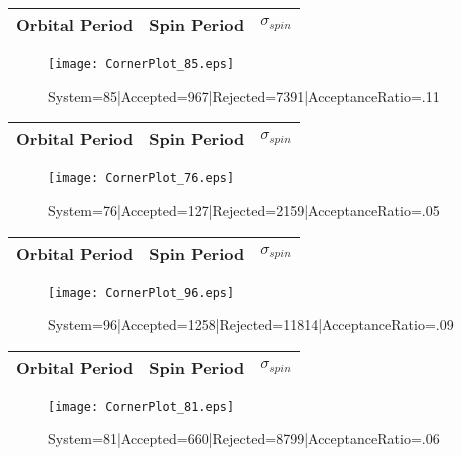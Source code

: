 \documentclass[10pt]{article}
\begin{document}
\listoffigures
\begin{center}
        \begin{tabular}{|c|c|c|}
        \hline
Orbital Period & Spin Period & $\sigma_{spin}$ \\
 \hline
        \end{tabular}
        \end{center}
\begin{figure}[h] 
        \texttt{[image: CornerPlot\_85.eps]}
        \caption{System=85|Accepted=967|Rejected=7391|AcceptanceRatio=.11}
        \label{S85}
        \centering
        \end{figure}
\begin{center}
        \begin{tabular}{|c|c|c|}
        \hline
Orbital Period & Spin Period & $\sigma_{spin}$ \\
 \hline
        \end{tabular}
        \end{center}
\begin{figure}[h] 
        \texttt{[image: CornerPlot\_76.eps]}
        \caption{System=76|Accepted=127|Rejected=2159|AcceptanceRatio=.05}
        \label{S76}
        \centering
        \end{figure}
\begin{center}
        \begin{tabular}{|c|c|c|}
        \hline
Orbital Period & Spin Period & $\sigma_{spin}$ \\
 \hline
        \end{tabular}
        \end{center}
\begin{figure}[h] 
        \texttt{[image: CornerPlot\_96.eps]}
        \caption{System=96|Accepted=1258|Rejected=11814|AcceptanceRatio=.09}
        \label{S96}
        \centering
        \end{figure}
\begin{center}
        \begin{tabular}{|c|c|c|}
        \hline
Orbital Period & Spin Period & $\sigma_{spin}$ \\
 \hline
        \end{tabular}
        \end{center}
\begin{figure}[h] 
        \texttt{[image: CornerPlot\_81.eps]}
        \caption{System=81|Accepted=660|Rejected=8799|AcceptanceRatio=.06}
        \label{S81}
        \centering
        \end{figure}
\end{document}
